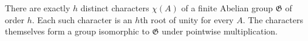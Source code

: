 There are exactly $h$ distinct characters $\chi(A)$ of a finite Abelian group $\mathfrak{G}$ of order $h$. Each such character is an $h$th root of unity for every $A$. The characters themselves form a group isomorphic to $\mathfrak{G}$ under pointwise multiplication.
